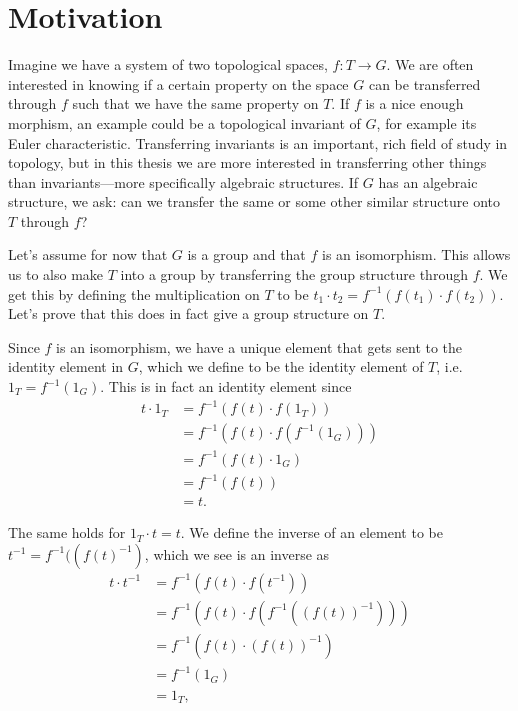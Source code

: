 

\section{Motivation}

Imagine we have a system of two topological spaces, $f:T\longrightarrow G$. We are often interested in knowing if a certain property on the space $G$ can be transferred through $f$ such that we have the same property on $T$. If $f$ is a nice enough morphism, an example could be a topological invariant of $G$, for example its Euler characteristic. Transferring invariants is an important, rich field of study in topology, but in this thesis we are more interested in transferring other things than invariants---more specifically algebraic structures. If $G$ has an algebraic structure, we ask: can we transfer the same or some other similar structure onto $T$ through $f$?

Let's assume for now that $G$ is a group and that $f$ is an isomorphism. This allows us to also make $T$ into a group by transferring the group structure through $f$. We get this by defining the multiplication on $T$ to be $t_1\cdot t_2 = f^{-1}(f(t_1)\cdot f(t_2))$. Let's prove that this does in fact give a group structure on $ T$. 

Since $ f$ is an isomorphism, we have a unique element that gets sent to the identity element in $ G$, which we define to be the identity element of $ T$, i.e. $ 1_T = f^{-1}(1_G)$. This is in fact an identity element since
\begin{align*} 
t\cdot 1_T &= f^{-1}(f(t)\cdot f(1_T)) \\ 
&= f^{-1}(f(t)\cdot f(f^{-1}(1_G))) \\ 
&= f^{-1}(f(t)\cdot 1_G) \\ 
&= f^{-1}(f(t)) \\ 
&= t . 
\end{align*}

 
The same holds for $ 1_T\cdot t = t$. We define the inverse of an element to be $ t^{-1} = f^{-1}((f(t)^{-1})$, which we see is an inverse as
\begin{align*} 
t\cdot t^{-1} 
&= f^{-1}(f(t)\cdot f(t^{-1})) \\ 
&= f^{-1}(f(t)\cdot f(f^{-1}((f(t))^{-1}))) \\ 
&= f^{-1}(f(t)\cdot (f(t))^{-1}) \\ 
&= f^{-1}(1_G) \\ 
&= 1_T, 
\end{align*}

